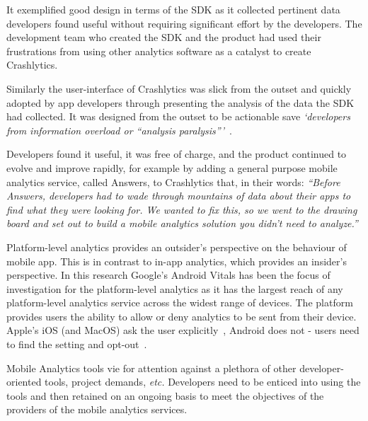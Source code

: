 It exemplified good design in terms of the SDK as it collected pertinent data developers found useful without requiring significant effort by the developers. The development team who created the SDK and the product had used their frustrations from using other analytics software as a catalyst to create Crashlytics. 

Similarly the user-interface of Crashlytics was slick from the outset and quickly adopted by app developers through presenting the analysis of the data the SDK had collected. It was designed from the outset to be actionable save \emph{`developers from information overload or ``analysis paralysis'''}~.

Developers found it useful, it was free of charge, and the product continued to evolve and improve rapidly, for example by adding a general purpose mobile analytics service, called Answers, to Crashlytics that, in their words: \emph{``Before Answers, developers had to wade through mountains of data about their apps to find what they were looking for. We wanted to fix this, so we went to the drawing board and set out to build a mobile analytics solution you didn’t need to analyze.''}~ 

Platform-level analytics provides an outsider's perspective on the behaviour of mobile app. This is in contrast to in-app analytics, which provides an insider's perspective. In this research Google's Android Vitals has been the focus of investigation for the platform-level analytics as it has the largest reach of any platform-level analytics service across the widest range of devices. The platform provides users the ability to allow or deny analytics to be sent from their device. Apple's iOS (and MacOS) ask the user explicitly~, Android does not - users need to find the setting and opt-out~. %

Mobile Analytics tools vie for attention against a plethora of other developer-oriented tools, project demands, \emph{etc.} Developers need to be enticed into using the tools and then retained on an ongoing basis to meet the objectives of the providers of the mobile analytics services.

